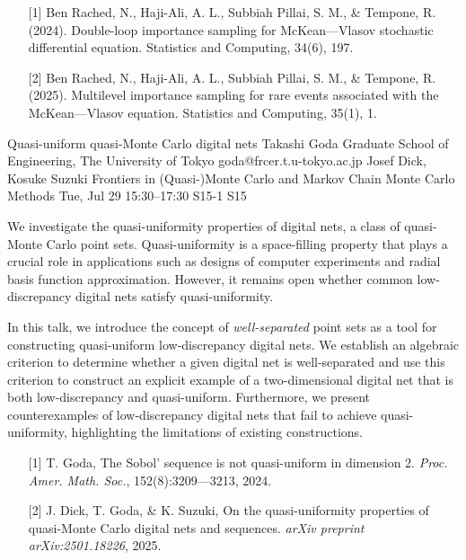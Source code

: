 \begin{talk}
\begin{enumerate}
	\item[{[1]}] Ben Rached, N., Haji-Ali, A. L., Subbiah Pillai, S. M., \& Tempone, R. (2024). Double-loop importance sampling for McKean---Vlasov stochastic differential equation. Statistics and Computing, 34(6), 197.
	\item[{[2]}] Ben Rached, N., Haji-Ali, A. L., Subbiah Pillai, S. M., \& Tempone, R. (2025). Multilevel importance sampling for rare events associated with the McKean---Vlasov equation. Statistics and Computing, 35(1), 1.
\end{enumerate}

\end{talk}

\begin{talk}
  {Quasi-uniform quasi-Monte Carlo digital nets}%
  {Takashi Goda}%
  {Graduate School of Engineering, The University of Tokyo}%
  {goda@frcer.t.u-tokyo.ac.jp}%
  {Josef Dick, Kosuke Suzuki}%
  {Frontiers in (Quasi-)Monte Carlo and Markov Chain Monte Carlo Methods}%
  {Tue, Jul 29 15:30–17:30}%
  {S15-1}%
  {S15}%
				
			
We investigate the quasi-uniformity properties of digital nets, a class of quasi-Monte Carlo point sets. Quasi-uniformity is a space-filling property that plays a crucial role in applications such as designs of computer experiments and radial basis function approximation. However, it remains open whether common low-discrepancy digital nets satisfy quasi-uniformity.

In this talk, we introduce the concept of \emph{well-separated} point sets as a tool for constructing quasi-uniform low-discrepancy digital nets. We establish an algebraic criterion to determine whether a given digital net is well-separated and use this criterion to construct an explicit example of a two-dimensional digital net that is both low-discrepancy and quasi-uniform. Furthermore, we present counterexamples of low-discrepancy digital nets that fail to achieve quasi-uniformity, highlighting the limitations of existing constructions.

\begin{enumerate}
	\item[{[1]}] T. Goda, The Sobol’ sequence is not quasi-uniform in dimension 2. \emph{Proc. Amer. Math. Soc.}, 152(8):3209---3213, 2024.
	\item[{[2]}] J. Dick, T. Goda, \& K. Suzuki, On the quasi-uniformity properties of quasi-Monte Carlo digital nets and sequences. \emph{arXiv preprint arXiv:2501.18226}, 2025.
\end{enumerate}
\end{talk}

